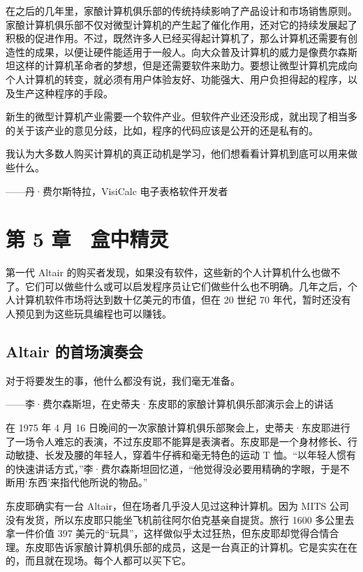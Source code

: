 \documentclass[12pt,UTF8]{ctexbook}
\begin{document}
在之后的几年里，家酿计算机俱乐部的传统持续影响了产品设计和市场销售原则。家酿计算机俱乐部不仅对微型计算机的产生起了催化作用，还对它的持续发展起了积极的促进作用。不过，既然许多人已经买得起计算机了，那么计算机还需要有创造性的成果，以便让硬件能适用于一般人。向大众普及计算机的威力是像费尔森斯坦这样的计算机革命者的梦想，但是还需要软件来助力。要想让微型计算机完成向个人计算机的转变，就必须有用户体验友好、功能强大、用户负担得起的程序，以及生产这种程序的手段。

新生的微型计算机产业需要一个软件产业。但软件产业还没形成，就出现了相当多的关于该产业的意见分歧，比如，程序的代码应该是公开的还是私有的。





我认为大多数人购买计算机的真正动机是学习，他们想看看计算机到底可以用来做些什么。

——丹·费尔斯特拉，VisiCalc 电子表格软件开发者





\chapter{第 5 章　盒中精灵}


第一代 Altair 的购买者发现，如果没有软件，这些新的个人计算机什么也做不了。它们可以做些什么或可以启发程序员让它们做些什么也不明确。几年之后，个人计算机软件市场将达到数十亿美元的市值，但在 20 世纪 70 年代，暂时还没有人预见到为这些玩具编程也可以赚钱。





\section{Altair 的首场演奏会}


对于将要发生的事，他什么都没有说，我们毫无准备。

——李·费尔森斯坦，在史蒂夫·东皮耶的家酿计算机俱乐部演示会上的讲话



在 1975 年 4 月 16 日晚间的一次家酿计算机俱乐部聚会上，史蒂夫·东皮耶进行了一场令人难忘的表演，不过东皮耶不能算是表演者。东皮耶是一个身材修长、行动敏捷、长发及腰的年轻人，穿着牛仔裤和毫无特色的运动 T 恤。“以年轻人惯有的快速讲话方式，”李·费尔森斯坦回忆道，“他觉得没必要用精确的字眼，于是不断用‘东西’来指代他所说的物品。”

东皮耶确实有一台 Altair，但在场者几乎没人见过这种计算机。因为 MITS 公司没有发货，所以东皮耶只能坐飞机前往阿尔伯克基亲自提货。旅行 1600 多公里去拿一件价值 397 美元的“玩具”，这样做似乎太过狂热，但东皮耶却觉得合情合理。东皮耶告诉家酿计算机俱乐部的成员，这是一台真正的计算机。它是实实在在的，而且就在现场。每个人都可以买下它。
\end{document}
